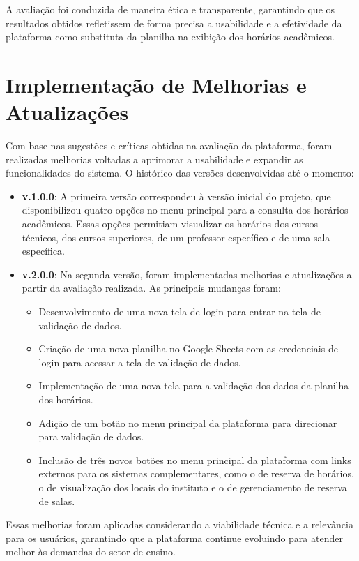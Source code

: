 A avaliação foi conduzida de maneira ética e transparente, garantindo que os resultados obtidos refletissem de forma precisa a usabilidade e a efetividade da plataforma como substituta da planilha na exibição dos horários acadêmicos.

\section{Implementação de Melhorias e Atualizações}

Com base nas sugestões e críticas obtidas na avaliação da plataforma, foram realizadas melhorias voltadas a aprimorar a usabilidade e expandir as funcionalidades do sistema. O histórico das versões desenvolvidas até o momento:

\begin{itemize}
    \item \textbf{v.1.0.0}: A primeira versão correspondeu à versão inicial do projeto, que disponibilizou quatro opções no menu principal para a consulta dos horários acadêmicos. Essas opções permitiam visualizar os horários dos cursos técnicos, dos cursos superiores, de um professor específico e de uma sala específica.
    \item \textbf{v.2.0.0}: Na segunda versão, foram implementadas melhorias e atualizações a partir da avaliação realizada. As principais mudanças foram:
    \begin{itemize}
        \item Desenvolvimento de uma nova tela de login para entrar na tela de validação de dados.
        \item Criação de uma nova planilha no Google Sheets com as credenciais de login para acessar a tela de validação de dados.
        \item Implementação de uma nova tela para a validação dos dados da planilha dos horários.
        \item Adição de um botão no menu principal da plataforma para direcionar para validação de dados.
        \item Inclusão de três novos botões no menu principal da plataforma com links externos para os sistemas complementares, como o de reserva de horários, o de visualização dos locais do instituto e o de gerenciamento de reserva de salas.
    \end{itemize}
\end{itemize}

Essas melhorias foram aplicadas considerando a viabilidade técnica e a relevância para os usuários, garantindo que a plataforma continue evoluindo para atender melhor às demandas do setor de ensino.

